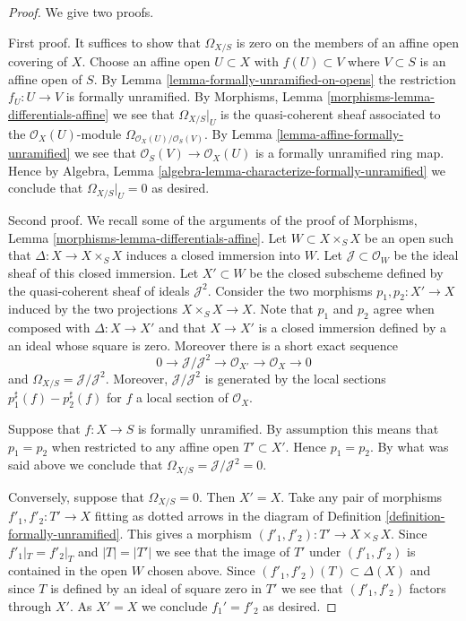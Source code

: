 \begin{proof}
We give two proofs.

\medskip\noindent
First proof. It suffices to show that $\Omega_{X/S}$ is zero on the members of
an affine open covering of $X$. Choose an affine open $U \subset X$
with $f(U) \subset V$ where $V \subset S$ is an affine open of $S$. By
Lemma \ref{lemma-formally-unramified-on-opens}
the restriction $f_U : U \to V$ is formally unramified. By
Morphisms, Lemma \ref{morphisms-lemma-differentials-affine}
we see that $\Omega_{X/S}|_U$ is the quasi-coherent sheaf associated to
the $\mathcal{O}_X(U)$-module $\Omega_{\mathcal{O}_X(U)/\mathcal{O}_S(V)}$. By
Lemma \ref{lemma-affine-formally-unramified}
we see that $\mathcal{O}_S(V) \to \mathcal{O}_X(U)$ is a formally unramified
ring map. Hence by
Algebra, Lemma \ref{algebra-lemma-characterize-formally-unramified}
we conclude that $\Omega_{X/S}|_U = 0$ as desired.

\medskip\noindent
Second proof. We recall some of the arguments of the proof of
Morphisms, Lemma \ref{morphisms-lemma-differentials-affine}.
Let $W \subset X \times_S X$ be an open such that
$\Delta : X \to X \times_S X$ induces a closed immersion into $W$.
Let $\mathcal{J} \subset \mathcal{O}_W$ be the ideal sheaf of this
closed immersion. Let $X' \subset W$ be the closed subscheme
defined by the quasi-coherent sheaf of ideals $\mathcal{J}^2$.
Consider the two morphisms $p_1, p_2 : X' \to X$ induced by
the two projections $X \times_S X \to X$.
Note that $p_1$ and $p_2$ agree when composed with $\Delta : X \to X'$
and that $X \to X'$ is a closed immersion defined by a an ideal
whose square is zero. Moreover there is a short exact sequence
$$
0 \to \mathcal{J}/\mathcal{J}^2 \to \mathcal{O}_{X'} \to \mathcal{O}_X \to 0
$$
and $\Omega_{X/S} = \mathcal{J}/\mathcal{J}^2$. Moreover,
$\mathcal{J}/\mathcal{J}^2$ is generated by the local
sections $p_1^\sharp(f) - p_2^\sharp(f)$ for $f$ a local section of
$\mathcal{O}_X$.

\medskip\noindent
Suppose that $f : X \to S$ is formally unramified.
By assumption this means that $p_1 = p_2$ when restricted to any
affine open $T' \subset X'$. Hence $p_1 = p_2$. By what was said above
we conclude that $\Omega_{X/S} = \mathcal{J}/\mathcal{J}^2 = 0$.

\medskip\noindent
Conversely, suppose that $\Omega_{X/S} = 0$. Then $X' = X$. Take any pair
of morphisms $f'_1, f'_2 : T' \to X$ fitting as dotted arrows in
the diagram of
Definition \ref{definition-formally-unramified}.
This gives a morphism $(f'_1, f'_2) : T' \to X \times_S X$.
Since $f'_1|_T = f'_2|_T$ and $|T| =|T'|$ we see that the image of $T'$
under $(f'_1, f'_2)$ is contained in the open $W$ chosen above. Since
$(f'_1, f'_2)(T) \subset \Delta(X)$ and since $T$ is defined by an ideal
of square zero in $T'$ we see that $(f'_1, f'_2)$ factors through $X'$.
As $X' = X$ we conclude $f_1' = f'_2$ as desired.
\end{proof}


